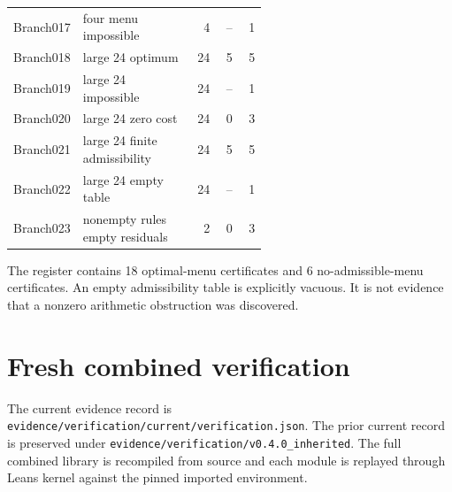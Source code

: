 \begin{longtable}{@{}p{0.14\linewidth}p{0.43\linewidth}rrr@{}}
Branch017 & four menu impossible & 4 & -- & 1\\

Branch018 & large 24 optimum & 24 & 5 & 5\\

Branch019 & large 24 impossible & 24 & -- & 1\\

Branch020 & large 24 zero cost & 24 & 0 & 3\\

Branch021 & large 24 finite admissibility & 24 & 5 & 5\\

Branch022 & large 24 empty table & 24 & -- & 1\\

Branch023 & nonempty rules empty residuals & 2 & 0 & 3\\

\bottomrule\end{longtable}

The register contains 18 optimal-menu certificates and 6 no-admissible-menu certificates. An empty admissibility table is explicitly vacuous. It is not evidence that a nonzero arithmetic obstruction was discovered.

\section{Fresh combined verification}

The current evidence record is \nolinkurl{evidence/verification/current/verification.json}. The prior current record is preserved under \nolinkurl{evidence/verification/v0.4.0_inherited}. The full combined library is recompiled from source and each module is replayed through Lean\textquotesingle s kernel against the pinned imported environment.

